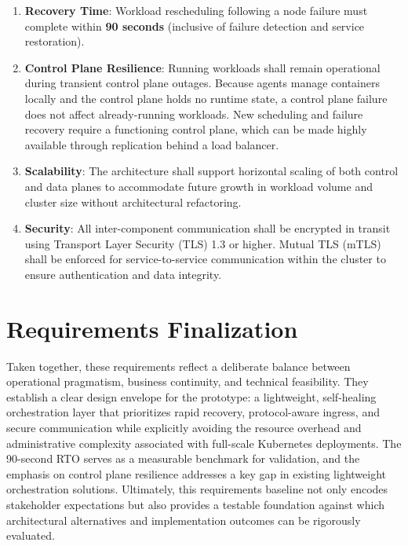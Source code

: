 \begin{enumerate}[label=\textbf{NFR\arabic*.}, left=0pt]

\item \textbf{Recovery Time}: Workload rescheduling following a node failure must complete within \textbf{90 seconds} (inclusive of failure detection and service restoration).

\item \textbf{Control Plane Resilience}: Running workloads shall remain operational during transient control plane outages. Because agents manage containers locally and the control plane holds no runtime state, a control plane failure does not affect already-running workloads. New scheduling and failure recovery require a functioning control plane, which can be made highly available through replication behind a load balancer.

\item \textbf{Scalability}: The architecture shall support horizontal scaling of both control and data planes to accommodate future growth in workload volume and cluster size without architectural refactoring.

\item \textbf{Security}: All inter-component communication shall be encrypted in transit using Transport Layer Security (TLS) 1.3 or higher. Mutual TLS (mTLS) shall be enforced for service-to-service communication within the cluster to ensure authentication and data integrity.

\end{enumerate}

\section{Requirements Finalization}

Taken together, these requirements reflect a deliberate balance between operational pragmatism, business continuity, and technical feasibility. They establish a clear design envelope for the prototype: a lightweight, self-healing orchestration layer that prioritizes rapid recovery, protocol-aware ingress, and secure communication while explicitly avoiding the resource overhead and administrative complexity associated with full-scale Kubernetes deployments. The 90-second RTO serves as a measurable benchmark for validation, and the emphasis on control plane resilience addresses a key gap in existing lightweight orchestration solutions. Ultimately, this requirements baseline not only encodes stakeholder expectations but also provides a testable foundation against which architectural alternatives and implementation outcomes can be rigorously evaluated.
